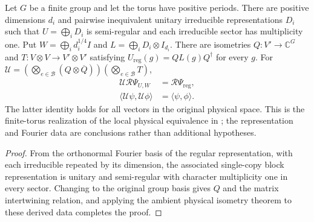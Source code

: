 \begin{theorem}%
    \label{thm:peps_torus_multiplicity_one_semiregular_equivalence}
    \leanok
    Let $G$ be a finite group and let the torus have positive periods.
    There are positive dimensions $d_i$ and pairwise inequivalent unitary
    irreducible representations $D_i$ such that $U=\bigoplus_iD_i$ is
    semi-regular and each irreducible sector has multiplicity one.
    Put $W=\bigoplus_i d_i^{1/4}I$ and
    $L=\bigoplus_i D_i\otimes I_{d_i}$.
    There are isometries $Q:V'\to\mathbb C^G$ and
    $T:V\otimes V\to V'\otimes V'$ satisfying
    $U_{\mathrm{reg}}(g)=QL(g)Q^\dagger$ for every $g$.
    For $\mathcal U=(\bigotimes_{e\in\mathcal B}(Q\otimes\overline Q))
        (\bigotimes_{e\in\mathcal B}T)$,
    \begin{align}
        \mathcal U\mathcal R\Psi_{U,W} & =\mathcal R\Psi_{\mathrm{reg}}, \\
        \langle\mathcal U\psi,\mathcal U\phi\rangle
                                       & =\langle\psi,\phi\rangle.
    \end{align}
    The latter identity holds for all vectors in the original physical space.
    This is the finite-torus realization of the local physical equivalence
    in \cite[Section~7]{Schuch2010PEPS}; the representation and Fourier data
    are conclusions rather than additional hypotheses.
\end{theorem}
\begin{proof}\leanok
    From the orthonormal Fourier basis of the regular representation, with
    each irreducible repeated by its dimension, the associated single-copy
    block representation is unitary and semi-regular with character
    multiplicity one in every sector. Changing to the original group basis
    gives $Q$ and the matrix intertwining relation, and applying the ambient
    physical isometry theorem to these derived data completes the proof.
\end{proof}
